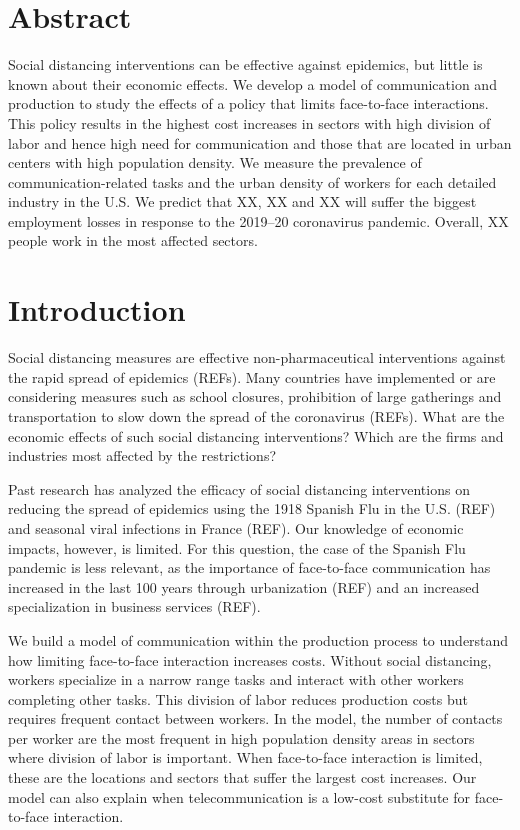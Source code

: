 \documentclass[10pt,letterpaper]{article}
\begin{document}
\section*{Abstract}
Social distancing interventions can be effective against epidemics, but little is known about their economic effects. We develop a model of communication and production to study the effects of a policy that limits face-to-face interactions. This policy results in the highest cost increases in sectors with high division of labor and hence high need for communication and those that are located in urban centers with high population density. We measure the prevalence of communication-related tasks and the urban density of workers for each detailed industry in the U.S. We predict that XX, XX and XX will suffer the biggest employment losses in response to the 2019--20 coronavirus pandemic. Overall, XX people work in the most affected sectors.

\linenumbers

\section*{Introduction}
Social distancing measures are effective non-pharmaceutical interventions against the rapid spread of epidemics (REFs). Many countries have implemented or are considering measures such as school closures, prohibition of large gatherings and transportation to slow down the spread of the coronavirus (REFs). What are the economic effects of such social distancing interventions? Which are the firms and industries most affected by the restrictions?

Past research has analyzed the efficacy of social distancing interventions on reducing the spread of epidemics using the 1918 Spanish Flu in the U.S. (REF) and seasonal viral infections in France (REF). Our knowledge of economic impacts, however, is limited. For this question, the case of the Spanish Flu pandemic is less relevant, as the importance of face-to-face communication has increased in the last 100 years through urbanization (REF) and an increased specialization in business services (REF).

We build a model of communication within the production process to understand how limiting face-to-face interaction increases costs. Without social distancing, workers specialize in a narrow range tasks and interact with other workers completing other tasks. This division of labor reduces production costs but requires frequent contact between workers. In the model, the number of contacts per worker are the most frequent in high population density areas in sectors where division of labor is important. When face-to-face interaction is limited, these are the locations and sectors that suffer the largest cost increases. Our model can also explain when telecommunication is a low-cost substitute for face-to-face interaction.
\end{document}
